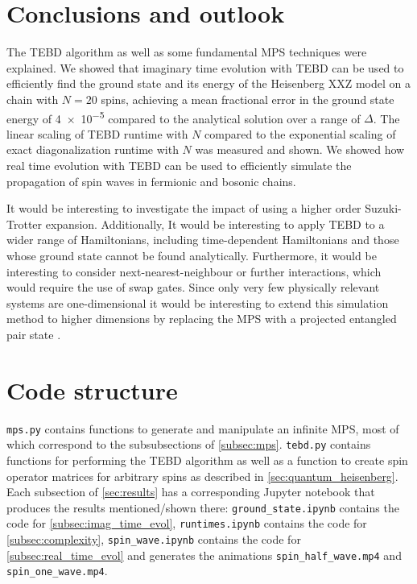 \documentclass[a4paper, headsepline, footheight=13.6pt]{scrartcl}
\begin{document}
\section{Conclusions and outlook}
The TEBD algorithm as well as some fundamental MPS techniques were explained. We showed that imaginary time evolution with TEBD can be used to efficiently find the ground state and its energy of the Heisenberg XXZ model on a chain with $N=20$ spins, achieving a mean fractional error in the ground state energy of \qty{4e-5}{} compared to the analytical solution over a range of $\Delta$. The linear scaling of TEBD runtime with $N$ compared to the exponential scaling of exact diagonalization runtime with $N$ was measured and shown. We showed how real time evolution with TEBD can be used to efficiently simulate the propagation of spin waves in fermionic and bosonic chains.

It would be interesting to investigate the impact of using a higher order Suzuki-Trotter expansion. Additionally, It would be interesting to apply TEBD to a wider range of Hamiltonians, including time-dependent Hamiltonians and those whose ground state cannot be found analytically. Furthermore, it would be interesting to consider next-nearest-neighbour or further interactions, which would require the use of swap gates. Since only very few physically relevant systems are one-dimensional it would be interesting to extend this simulation method to higher dimensions by replacing the MPS with a projected entangled pair state \cite{Verstraete:2004cf}.

\newpage
\appendix
\section{Code structure}
\verb|mps.py| contains functions to generate and manipulate an infinite MPS, most of which correspond to the subsubsections of \autoref{subsec:mps}. \verb|tebd.py| contains functions for performing the TEBD algorithm as well as a function to create spin operator matrices for arbitrary spins as described in \autoref{sec:quantum_heisenberg}. Each subsection of \autoref{sec:results} has a corresponding Jupyter notebook that produces the results mentioned/shown there: \verb|ground_state.ipynb| contains the code for \autoref{subsec:imag_time_evol}, \verb|runtimes.ipynb| contains the code for \autoref{subsec:complexity}, \verb|spin_wave.ipynb| contains the code for \autoref{subsec:real_time_evol} and generates the animations \verb|spin_half_wave.mp4| and \verb|spin_one_wave.mp4|.
\end{document}
